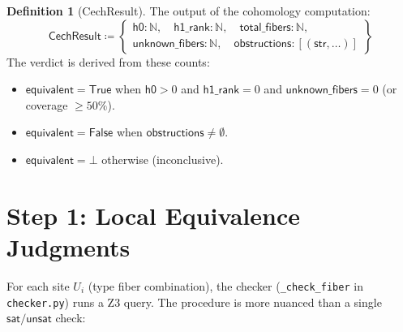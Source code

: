 \documentclass[11pt,a4paper]{report}
\theoremstyle{definition}
\newtheorem{definition}{Definition}[chapter]
\theoremstyle{plain}
\newcommand{\Nat}{\mathbb{N}}
\begin{document}
\begin{definition}[CechResult]
The output of the cohomology computation:
\[
  \mathsf{CechResult} \coloneqq \left\{
  \begin{array}{l}
    \mathsf{h0} : \Nat, \quad
    \mathsf{h1\_rank} : \Nat, \quad
    \mathsf{total\_fibers} : \Nat, \\
    \mathsf{unknown\_fibers} : \Nat, \quad
    \mathsf{obstructions} : [(\mathsf{str}, \ldots)]
  \end{array}\right\}
\]
The verdict is derived from these counts:
\begin{itemize}
  \item $\mathsf{equivalent} = \mathsf{True}$ when $\mathsf{h0} > 0$
    and $\mathsf{h1\_rank} = 0$ and
    $\mathsf{unknown\_fibers} = 0$ (or coverage $\geq 50\%$).
  \item $\mathsf{equivalent} = \mathsf{False}$ when
    $\mathsf{obstructions} \neq \emptyset$.
  \item $\mathsf{equivalent} = \bot$ otherwise (inconclusive).
\end{itemize}
\end{definition}

\section{Step 1: Local Equivalence Judgments}

For each site $U_i$ (type fiber combination), the checker
(\texttt{\_check\_fiber} in \texttt{checker.py}) runs a Z3
query.  The procedure is more nuanced than a single
$\mathsf{sat}/\mathsf{unsat}$ check:
\end{document}
